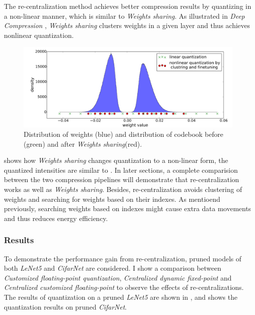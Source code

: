\documentclass[a4paper,12pt]{report}
\begin{document}
The re-centralization method achieves better compression results by quantizing in
a non-linear manner, which is similar to \textit{Weights sharing}.
As illustrated in \textit{Deep Compression} \cite{Han15}, \textit{Weights
sharing} clusters weights in a given layer and thus achieves nonlinear quantization.
\begin{figure}[!h]
  \centering
  \includegraphics[width=\textwidth]{fig_weightsshare.png}%
  \caption{Distribution of weights (blue) and distribution of codebook
  before (green) and after \textit{Weights sharing}(red).}
  \label{fig:ws}
\end{figure}

 shows how \textit{Weights sharing} changes quantization to a
non-linear form, the quantized intensities are similar to .
In later sections, a complete comparision between the two compression pipelines
will demonstrate that re-centralization works as well as \textit{Weights sharing}.
Besides, re-centralization avoids clustering of weights and searching for weights
based on their indexes.
As mentioend previously, searching weights based on indexes might cause extra
data movements and thus reduces energy efficiency.

\subsubsection{Results}
To demonstrate the performance gain from re-centralization,
pruned models of both \textit{LeNet5} and \textit{CifarNet} are considered.
I show a comparison between
\textit{Customized floating-point quantization}, \textit{Centralized dynamic
fixed-point} and
\textit{Centralized customized floating-point} to observe the effects of
re-centralizations.
The results of quantization on a pruned \textit{LeNet5} are shown in
, and  shows the quantization
results on pruned \textit{CifarNet}.
\end{document}
